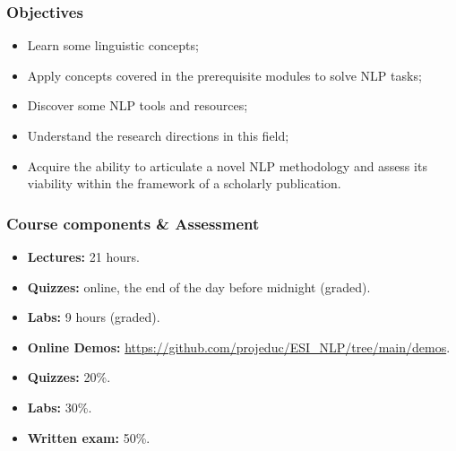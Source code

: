 \documentclass{beamer}
\begin{document}
\begin{frame}
\frametitle{Objectives}

\begin{itemize}
	\item Learn some linguistic concepts;
	\item Apply concepts covered in the prerequisite modules to solve NLP tasks;
	\item Discover some NLP tools and resources;
	\item Understand the research directions in this field;
	\item Acquire the ability to articulate a novel NLP methodology and assess its viability within the framework of a scholarly publication.
\end{itemize}

\end{frame}


\begin{frame}
\frametitle{Course components \& Assessment}

\begin{itemize}
	\item \textbf{Lectures:} 21 hours.
	\item \textbf{Quizzes:} online, the end of the day before midnight (graded).
	\item \textbf{Labs:} 9 hours (graded).
	\item \textbf{Online Demos:} {\scriptsize\url{https://github.com/projeduc/ESI_NLP/tree/main/demos}}.
\end{itemize}

\vfill

\begin{itemize}
	\item \textbf{Quizzes:} 20\%.
	\item \textbf{Labs:} 30\%.
	\item \textbf{Written exam:} 50\%.
\end{itemize}

\end{frame}
\end{document}
